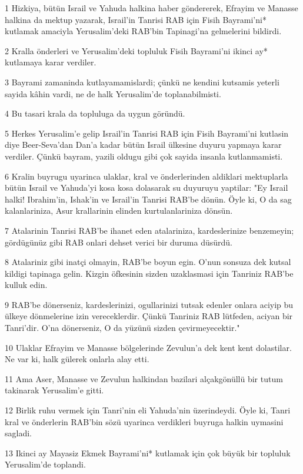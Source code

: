 \par 1 Hizkiya, bütün Israil ve Yahuda halkina haber göndererek, Efrayim ve Manasse halkina da mektup yazarak, Israil'in Tanrisi RAB için Fisih Bayrami'ni* kutlamak amaciyla Yerusalim'deki RAB'bin Tapinagi'na gelmelerini bildirdi.
\par 2 Kralla önderleri ve Yerusalim'deki topluluk Fisih Bayrami'ni ikinci ay* kutlamaya karar verdiler.
\par 3 Bayrami zamaninda kutlayamamislardi; çünkü ne kendini kutsamis yeterli sayida kâhin vardi, ne de halk Yerusalim'de toplanabilmisti.
\par 4 Bu tasari krala da topluluga da uygun göründü.
\par 5 Herkes Yerusalim'e gelip Israil'in Tanrisi RAB için Fisih Bayrami'ni kutlasin diye Beer-Seva'dan Dan'a kadar bütün Israil ülkesine duyuru yapmaya karar verdiler. Çünkü bayram, yazili oldugu gibi çok sayida insanla kutlanmamisti.
\par 6 Kralin buyrugu uyarinca ulaklar, kral ve önderlerinden aldiklari mektuplarla bütün Israil ve Yahuda'yi kosa kosa dolasarak su duyuruyu yaptilar: "Ey Israil halki! Ibrahim'in, Ishak'in ve Israil'in Tanrisi RAB'be dönün. Öyle ki, O da sag kalanlariniza, Asur krallarinin elinden kurtulanlariniza dönsün.
\par 7 Atalarinin Tanrisi RAB'be ihanet eden atalariniza, kardeslerinize benzemeyin; gördügünüz gibi RAB onlari dehset verici bir duruma düsürdü.
\par 8 Atalariniz gibi inatçi olmayin, RAB'be boyun egin. O'nun sonsuza dek kutsal kildigi tapinaga gelin. Kizgin öfkesinin sizden uzaklasmasi için Tanriniz RAB'be kulluk edin.
\par 9 RAB'be dönerseniz, kardeslerinizi, ogullarinizi tutsak edenler onlara aciyip bu ülkeye dönmelerine izin vereceklerdir. Çünkü Tanriniz RAB lütfeden, aciyan bir Tanri'dir. O'na dönerseniz, O da yüzünü sizden çevirmeyecektir."
\par 10 Ulaklar Efrayim ve Manasse bölgelerinde Zevulun'a dek kent kent dolastilar. Ne var ki, halk gülerek onlarla alay etti.
\par 11 Ama Aser, Manasse ve Zevulun halkindan bazilari alçakgönüllü bir tutum takinarak Yerusalim'e gitti.
\par 12 Birlik ruhu vermek için Tanri'nin eli Yahuda'nin üzerindeydi. Öyle ki, Tanri kral ve önderlerin RAB'bin sözü uyarinca verdikleri buyruga halkin uymasini sagladi.
\par 13 Ikinci ay Mayasiz Ekmek Bayrami'ni* kutlamak için çok büyük bir topluluk Yerusalim'de toplandi.
